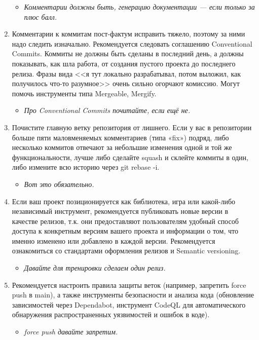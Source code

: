 \documentclass{../../text-style}
\begin{document}
\begin{enumerate}
\begin{itemize}
    \end{itemize}
    \begin{itemize}
        \item \emph{Комментарии должны быть, генерацию документации --- если только за плюс балл.}
    \end{itemize}
    \item Комментарии к коммитам пост-фактум исправить тяжело, поэтому за ними надо следить изначально. Рекомендуется следовать соглашению Conventional Commits. Коммиты не должны быть сделаны в последний день, а должны показывать, как шла работа, от создания пустого проекта до последнего релиза. Фразы вида <<я тут локально разрабатывал, потом выложил, как получилось что-то разумное>> очень сильно огорчают комиссию. Могут помочь инструменты типа Mergeable, Mergify.
    \begin{itemize}
        \item \emph{Про Conventional Commits почитайте, если ещё не.}
    \end{itemize}
    \item Почистите главную ветку репозитория от лишнего. Если у вас в репозитории больше пяти маловменяемых комментариев (типа «fix») подряд, либо несколько коммитов отвечают за небольшие изменения одной и той же функциональности, лучше либо сделайте squash и склейте коммиты в один, либо измените всю историю через git rebase -i.
    \begin{itemize}
        \item \emph{Вот это обязательно.}
    \end{itemize}
    \item Если ваш проект позиционируется как библиотека, игра или какой-либо независимый инструмент, рекомендуется публиковать новые версии в качестве релизов, т.к. они предоставляют пользователям удобный способ доступа к конкретным версиям вашего проекта и информации о том, что именно изменено или добавлено в каждой версии. Рекомендуется ознакомиться со стандартами оформления релизов и Semantic versioning.
    \begin{itemize}
        \item \emph{Давайте для тренировки сделаем один релиз.}
    \end{itemize}
    \item Рекомендуется настроить правила защиты веток (например, запретить force push в main), а также инструменты безопасности и анализа кода (обновление зависимостей через Dependabot, инструмент CodeQL для автоматического обнаружения распространенных уязвимостей и ошибок в коде).
    \begin{itemize}
        \item \emph{force push давайте запретим.}
    \end{itemize}
\end{enumerate}
\end{document}
